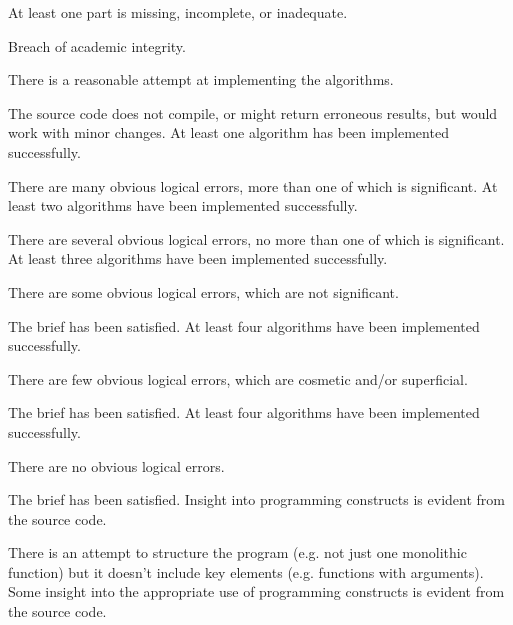 \documentclass{../../fal_assignment}
\begin{document}
\begin{markingrubric}
%
        \grade \fail At least one part is missing, incomplete, or inadequate.
                   \par Breach of academic integrity.
                   
        \grade  %
        \grade  %
        \grade  %
        \grade  %
        \grade  %
%

        \grade\fail 	There is a reasonable attempt at implementing the algorithms.
            \par 		The source code does not compile, or might return erroneous results, but would work with minor changes.
        \grade 		At least one algorithm has been implemented successfully.
            \par 		There are many obvious logical errors, more than one of which is significant.   
        \grade 		At least two algorithms have been  implemented successfully.
            \par 		There are several obvious logical errors, no more than one of which is significant. 
        \grade 		At least three algorithms have been implemented successfully.
            \par 		There are some obvious logical errors, which are not significant. 
            \par		The brief has been satisfied.
        \grade 		At least four algorithms have been implemented successfully.
            \par 		There are few obvious logical errors, which are cosmetic and/or superficial.
            \par		The brief has been satisfied.     
        \grade 		At least four algorithms have been implemented successfully.
            \par		There are no obvious logical errors.
            \par		The brief has been satisfied.
%
        \grade\fail Insight into programming constructs is evident from the source code.
            \par There is an attempt to structure the program (e.g. not just one monolithic function) but it doesn't include key elements (e.g. functions with arguments).
        \grade Some insight into the appropriate use of programming constructs is evident from the source code.

\end{markingrubric}
\end{document}
